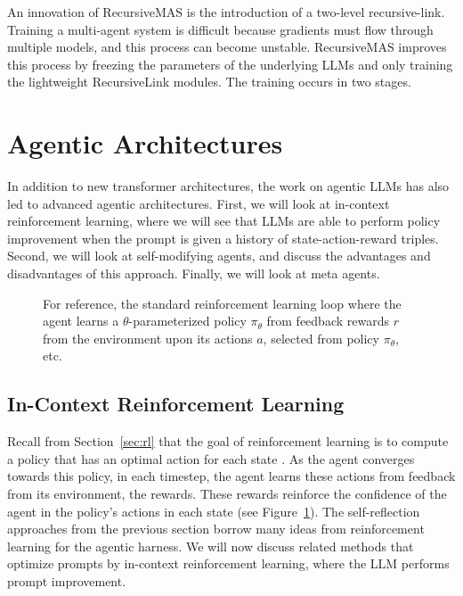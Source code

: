 An innovation of RecursiveMAS is the introduction of a two-level recursive-link. Training a multi-agent system is  difficult because gradients must flow through multiple models, and this process can become unstable. RecursiveMAS improves this process by freezing the parameters of the underlying LLMs and only training the lightweight RecursiveLink modules. The training occurs in two stages.


\section{Agentic Architectures}
In addition to new transformer architectures, the work on agentic LLMs has also led to advanced agentic architectures. First, we will look at in-context  reinforcement learning, where we will see that LLMs are able to perform policy improvement when the prompt is given a history of state-action-reward triples. Second, we will look at self-modifying agents, and discuss the advantages and disadvantages of this approach. Finally, we will look at meta agents.



\begin{figure}
  \begin{center}
    
    \caption{For reference, the standard reinforcement learning loop where the agent learns a $\theta$-parameterized policy $\pi_\theta$ from feedback rewards $r$ from the environment upon its actions $a$, selected from policy $\pi_\theta$, etc. \citep{sutton2018reinforcement}}\label{fig:rl6}
  \end{center}
\end{figure}


\subsection{In-Context Reinforcement Learning}\label{sec:icrl}
Recall from Section~\ref{sec:rl} that the goal of reinforcement learning is to compute a  policy that has an optimal action  for each state \citep{sutton2018reinforcement}. 
As the agent converges towards this policy, in each timestep, the agent learns these actions from feedback from its environment, the rewards.  
These rewards reinforce the confidence of the agent in the policy's actions in each state (see Figure~\ref{fig:rl6}). %
The self-reflection approaches from the previous section borrow  many ideas from reinforcement learning for the agentic harness. We will now discuss related methods that optimize prompts by  in-context reinforcement learning, where the LLM performs prompt improvement.



